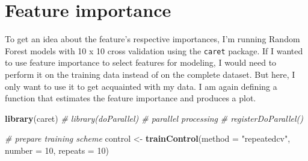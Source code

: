 \documentclass[]{book}
\newenvironment{Shaded}{\begin{snugshade}}{\end{snugshade}}
\newcommand{\CommentTok}[1]{\textcolor[rgb]{0.56,0.35,0.01}{\textit{#1}}}
\newcommand{\DataTypeTok}[1]{\textcolor[rgb]{0.13,0.29,0.53}{#1}}
\newcommand{\DecValTok}[1]{\textcolor[rgb]{0.00,0.00,0.81}{#1}}
\newcommand{\KeywordTok}[1]{\textcolor[rgb]{0.13,0.29,0.53}{\textbf{#1}}}
\newcommand{\NormalTok}[1]{#1}
\newcommand{\StringTok}[1]{\textcolor[rgb]{0.31,0.60,0.02}{#1}}
\begin{document}
\hypertarget{feature-importance}{%
\section{Feature importance}\label{feature-importance}}

To get an idea about the feature's respective importances, I'm running Random Forest models with 10 x 10 cross validation using the \texttt{caret} package. If I wanted to use feature importance to select features for modeling, I would need to perform it on the training data instead of on the complete dataset. But here, I only want to use it to get acquainted with my data. I am again defining a function that estimates the feature importance and produces a plot.

\begin{Shaded}
\begin{Highlighting}[]
\KeywordTok{library}\NormalTok{(caret)}
\CommentTok{# library(doParallel) # parallel processing}
\CommentTok{# registerDoParallel()}

\CommentTok{# prepare training scheme}
\NormalTok{control <-}\StringTok{ }\KeywordTok{trainControl}\NormalTok{(}\DataTypeTok{method =} \StringTok{"repeatedcv"}\NormalTok{, }\DataTypeTok{number =} \DecValTok{10}\NormalTok{, }\DataTypeTok{repeats =} \DecValTok{10}\NormalTok{)}
\end{Highlighting}
\end{Shaded}
\end{document}
